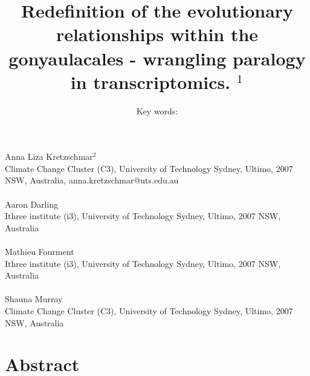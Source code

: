 \documentclass[12pt]{article}
\title{Redefinition of the evolutionary relationships within the gonyaulacales - wrangling paralogy in transcriptomics. $^{1}$}
\author{Key words: }
\date{}
\begin{document}
\maketitle
\paragraph{}Anna Liza Kretzschmar$^{2}$\\
Climate Change Cluster (C3), University of Technology Sydney, Ultimo, 2007 NSW, Australia, anna.kretzschmar@uts.edu.au
\paragraph{}Aaron Darling \\
Ithree institute (i3), University of Technology Sydney, Ultimo, 2007 NSW, Australia
\paragraph{}Mathieu Fourment \\
Ithree institute (i3), University of Technology Sydney, Ultimo, 2007 NSW, Australia
\paragraph{}Shauna Murray\\ 
Climate Change Cluster (C3), University of Technology Sydney, Ultimo, 2007 NSW, Australia
\newpage
\section{Abstract}
\newpage
\end{document}
